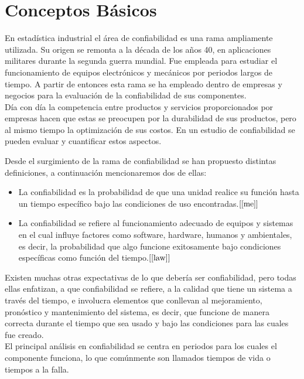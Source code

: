 
\chapter{Conceptos B\'asicos}
\noindent En  estad\'istica industrial el \'area de confiabilidad es una rama ampliamente utilizada.
Su origen se remonta a  la d\'ecada de los a\~nos 40, en aplicaciones militares durante la segunda guerra mundial. Fue empleada para estudiar el funcionamiento de equipos electr\'onicos y mec\'anicos  por periodos largos de tiempo. A partir de entonces esta rama se ha empleado dentro de empresas y negocios para la evaluaci\'on de la confiabilidad de sus componentes.\\[0.1cm]
\noindent  D\'ia con d\'ia la competencia entre productos y servicios proporcionados por empresas hacen que estas  se preocupen por la durabilidad de sus productos, pero al mismo tiempo la optimizaci\'on de sus costos. En un estudio de confiabilidad se pueden evaluar y cuantificar estos aspectos.

\noindent Desde el surgimiento de la rama de confiabilidad se han propuesto distintas definiciones, a continuaci\'on mencionaremos dos de ellas:

\begin{itemize}
\item  La confiabilidad es la probabilidad de que una unidad realice su funci\'on hasta un tiempo espec\'ifico bajo las condiciones de uso encontradas.$[{\bf \ref{me}}]$
\item La confiabilidad se refiere al funcionamiento adecuado de equipos y sistemas en el cual influye factores como software, hardware, humanos y ambientales, es decir, la probabilidad que algo funcione exitosamente bajo condiciones espec\'ificas como funci\'on del tiempo.$[{\bf \ref{law}}]$
\end{itemize} 
\noindent  Existen muchas otras expectativas de lo que deber\'ia ser  confiabilidad, pero todas ellas enfatizan, a que confiabilidad se refiere, a la calidad que tiene un sistema a trav\'es del tiempo, e involucra elementos que conllevan al mejoramiento, pron\'ostico y mantenimiento del sistema, es decir, que funcione de manera correcta durante el tiempo que sea usado y bajo las condiciones para las cuales fue creado. \\[0.2cm]


\noindent El principal an\'alisis en confiabilidad se centra en  periodos para los cuales el componente funciona, lo que com\'unmente son llamados tiempos de vida o tiempos a la falla. 

